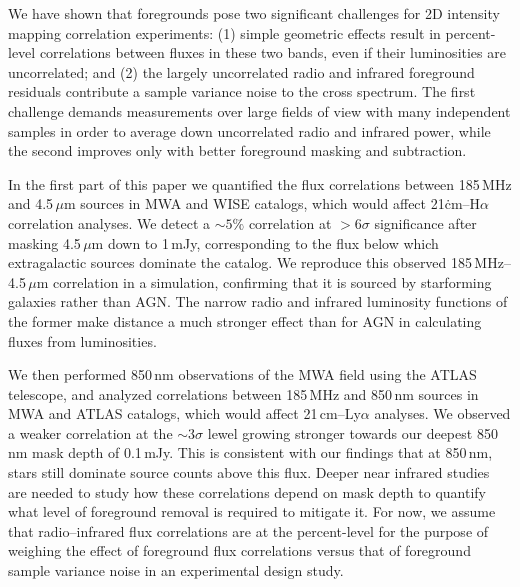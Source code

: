 \documentclass[numberedappendix]{emulateapj}
\begin{document}
We have shown that foregrounds pose two significant challenges for 2D intensity mapping correlation experiments: (1) simple geometric effects result in percent-level correlations between fluxes in these two bands, even if their luminosities are uncorrelated; and (2) the largely uncorrelated radio and infrared foreground residuals contribute a sample variance noise to the cross spectrum. The first challenge demands measurements over large fields of view with many independent samples in order to average down uncorrelated radio and infrared power, while the second improves only with better foreground masking and subtraction.

In the first part of this paper we quantified the flux correlations between 185\,MHz and 4.5\,$\mu$m sources in MWA and WISE catalogs, which would affect 21\.cm--H$\alpha$ correlation analyses. We detect a $\sim5\%$ correlation at $>6\sigma$ significance after masking 4.5\,$\mu$m down to 1\,mJy, corresponding to the flux below which extragalactic sources dominate the catalog. We reproduce this observed 185\,MHz--4.5\,$\mu$m correlation in a simulation, confirming that it is sourced by starforming galaxies rather than AGN. The narrow radio and infrared luminosity functions of the former make distance a much stronger effect than for AGN in calculating fluxes from luminosities. 

We then performed 850\,nm observations of the MWA field using the ATLAS telescope, and analyzed correlations between 185\,MHz and 850\,nm sources in MWA and ATLAS catalogs, which would affect 21\,cm--Ly$\alpha$ analyses. We observed a weaker correlation at the $\sim3\sigma$ lewel growing stronger towards our deepest 850\,nm mask depth of 0.1\,mJy. This is consistent with our findings that at 850\,nm, stars still dominate source counts above this flux. Deeper near infrared studies are needed to study how these correlations depend on mask depth to quantify what level of foreground removal is required to mitigate it. For now, we assume that radio--infrared flux correlations are at the percent-level for the purpose of weighing the effect of foreground flux correlations versus that of foreground sample variance noise in an experimental design study.
\end{document}
